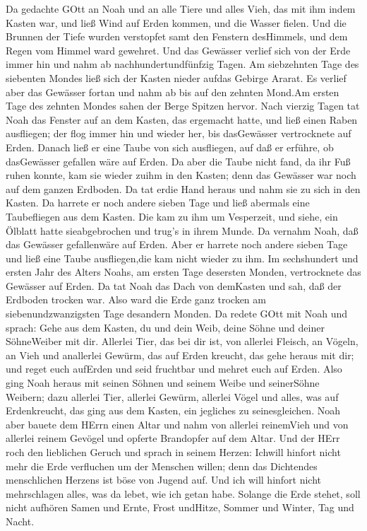 Da gedachte GOtt an Noah und an alle Tiere und alles Vieh,
das mit ihm indem Kasten war, und ließ Wind auf Erden kommen, und die
Wasser fielen.  Und die Brunnen der Tiefe wurden verstopfet
samt den Fenstern desHimmels, und dem Regen vom Himmel ward gewehret.
 Und das Gewässer verlief sich von der Erde immer hin und
nahm ab nachhundertundfünfzig Tagen.  Am siebzehnten Tage
des siebenten Mondes ließ sich der Kasten nieder aufdas Gebirge Ararat.
 Es verlief aber das Gewässer fortan und nahm ab bis auf den
zehnten Mond.Am ersten Tage des zehnten Mondes sahen der Berge Spitzen
hervor.  Nach vierzig Tagen tat Noah das Fenster auf an dem
Kasten, das ergemacht hatte,  und ließ einen Raben
ausfliegen; der flog immer hin und wieder her, bis dasGewässer
vertrocknete auf Erden.  Danach ließ er eine Taube von sich
ausfliegen, auf daß er erführe, ob dasGewässer gefallen wäre auf Erden.
 Da aber die Taube nicht fand, da ihr Fuß ruhen konnte, kam
sie wieder zuihm in den Kasten; denn das Gewässer war noch auf dem
ganzen Erdboden. Da tat erdie Hand heraus und nahm sie zu sich in den
Kasten.  Da harrete er noch andere sieben Tage und ließ
abermals eine Taubefliegen aus dem Kasten.  Die kam zu ihm
um Vesperzeit, und siehe, ein Ölblatt hatte sieabgebrochen und trug's in
ihrem Munde. Da vernahm Noah, daß das Gewässer gefallenwäre auf Erden.
 Aber er harrete noch andere sieben Tage und ließ eine
Taube ausfliegen,die kam nicht wieder zu ihm.  Im
sechshundert und ersten Jahr des Alters Noahs, am ersten Tage desersten
Monden, vertrocknete das Gewässer auf Erden. Da tat Noah das Dach von
demKasten und sah, daß der Erdboden trocken war.  Also ward
die Erde ganz trocken am siebenundzwanzigsten Tage desandern Monden.
 Da redete GOtt mit Noah und sprach:  Gehe aus
dem Kasten, du und dein Weib, deine Söhne und deiner SöhneWeiber mit
dir.  Allerlei Tier, das bei dir ist, von allerlei Fleisch,
an Vögeln, an Vieh und anallerlei Gewürm, das auf Erden kreucht, das
gehe heraus mit dir; und reget euch aufErden und seid fruchtbar und
mehret euch auf Erden.  Also ging Noah heraus mit seinen
Söhnen und seinem Weibe und seinerSöhne Weibern;  dazu
allerlei Tier, allerlei Gewürm, allerlei Vögel und alles, was auf
Erdenkreucht, das ging aus dem Kasten, ein jegliches zu seinesgleichen.
 Noah aber bauete dem HErrn einen Altar und nahm von
allerlei reinemVieh und von allerlei reinem Gevögel und opferte
Brandopfer auf dem Altar.  Und der HErr roch den lieblichen
Geruch und sprach in seinem Herzen: Ichwill hinfort nicht mehr die Erde
verfluchen um der Menschen willen; denn das Dichtendes menschlichen
Herzens ist böse von Jugend auf. Und ich will hinfort nicht mehrschlagen
alles, was da lebet, wie ich getan habe.  Solange die Erde
stehet, soll nicht aufhören Samen und Ernte, Frost undHitze, Sommer und
Winter, Tag und Nacht.

